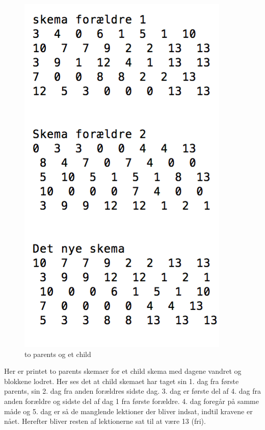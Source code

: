 \begin{figure}[!h]
  \includegraphics[width=\textwidth]{partials/graphics/crossovertest.png}
  \caption{to parents og et child}
  \label{fig:crossovertest}
\end{figure}

Her er printet to parents skemaer for et child skema med dagene vandret og blokkene lodret. Her ses det at child skemaet har taget sin 1. dag fra første parents, sin 2. dag fra anden forældres sidste dag. 3. dag er første del af 4. dag fra anden forældre og sidste del af dag 1 fra første forældre. 4. dag foregår på samme måde og 5. dag er så de manglende lektioner der bliver indsat, indtil kravene er nået. Herefter bliver resten af lektionerne sat til at være 13 (fri).

